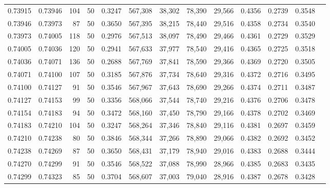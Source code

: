 \begin{tabular}{rrrrrrrrrrrrr}
0.73915 & 0.73946 &   104 &  50 &                                     0.3247 & 567,308 &  38,302 &  78,390 &  29,566 & 0.4356 & 0.2739 & 0.3548 \\
0.73946 & 0.73973 &    87 &  50 &                                     0.3650 & 567,395 &  38,215 &  78,440 &  29,516 & 0.4358 & 0.2734 & 0.3540 \\
0.73973 & 0.74005 &   118 &  50 &                                     0.2976 & 567,513 &  38,097 &  78,490 &  29,466 & 0.4361 & 0.2729 & 0.3529 \\
0.74005 & 0.74036 &   120 &  50 &                                     0.2941 & 567,633 &  37,977 &  78,540 &  29,416 & 0.4365 & 0.2725 & 0.3518 \\
0.74036 & 0.74071 &   136 &  50 &                                     0.2688 & 567,769 &  37,841 &  78,590 &  29,366 & 0.4369 & 0.2720 & 0.3505 \\
0.74071 & 0.74100 &   107 &  50 &                                     0.3185 & 567,876 &  37,734 &  78,640 &  29,316 & 0.4372 & 0.2716 & 0.3495 \\
0.74100 & 0.74127 &    91 &  50 &                                     0.3546 & 567,967 &  37,643 &  78,690 &  29,266 & 0.4374 & 0.2711 & 0.3487 \\
0.74127 & 0.74153 &    99 &  50 &                                     0.3356 & 568,066 &  37,544 &  78,740 &  29,216 & 0.4376 & 0.2706 & 0.3478 \\
0.74154 & 0.74183 &    94 &  50 &                                     0.3472 & 568,160 &  37,450 &  78,790 &  29,166 & 0.4378 & 0.2702 & 0.3469 \\
0.74183 & 0.74210 &   104 &  50 &                                     0.3247 & 568,264 &  37,346 &  78,840 &  29,116 & 0.4381 & 0.2697 & 0.3459 \\
0.74210 & 0.74238 &    80 &  50 &                                     0.3846 & 568,344 &  37,266 &  78,890 &  29,066 & 0.4382 & 0.2692 & 0.3452 \\
0.74238 & 0.74269 &    87 &  50 &                                     0.3650 & 568,431 &  37,179 &  78,940 &  29,016 & 0.4383 & 0.2688 & 0.3444 \\
0.74270 & 0.74299 &    91 &  50 &                                     0.3546 & 568,522 &  37,088 &  78,990 &  28,966 & 0.4385 & 0.2683 & 0.3435 \\
0.74299 & 0.74323 &    85 &  50 &                                     0.3704 & 568,607 &  37,003 &  79,040 &  28,916 & 0.4387 & 0.2678 & 0.3428 \\

\end{tabular}
